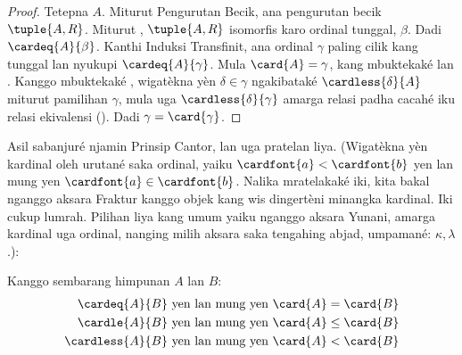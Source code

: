 \documentclass[../../../include/open-logic-section]{subfiles}
\begin{document}
\begin{proof}
Tetepna $A$. Miturut Pengurutan Becik, ana pengurutan becik
$\tuple{A, R}$. Miturut
, $\tuple{A,
R}$ isomorfis karo ordinal tunggal, $\beta$. Dadi
$\cardeq{A}{\beta}$. Kanthi Induksi Transfinit, ana ordinal
$\gamma$ paling cilik kang tunggal lan nyukupi
$\cardeq{A}{\gamma}$. Mula $\card{A}
= \gamma$, kang mbuktekaké  lan .
Kanggo mbuktekaké , wigatèkna yèn $\delta \in \gamma$
ngakibataké $\cardless{\delta}{A}$ miturut pamilihan $\gamma$,
mula uga $\cardless{\delta}{\gamma}$ amarga relasi padha cacahé
iku relasi ekivalensi
(). Dadi $\gamma =
\card{\gamma}$.
\end{proof}

Asil sabanjuré njamin Prinsip Cantor, lan uga pratelan liya.
(Wigatèkna yèn kardinal oleh urutané saka ordinal, yaiku
$\cardfont{a} < \cardfont{b}$ yen lan mung yen $\cardfont{a} \in \cardfont{b}$. Nalika
mratelakaké iki, kita bakal nganggo aksara Fraktur kanggo objek
kang wis dingertèni minangka kardinal. Iki cukup lumrah.
Pilihan liya kang umum yaiku nganggo aksara Yunani,
amarga kardinal uga ordinal, nanging milih aksara saka
tengahing abjad, umpamané: $\kappa, \lambda$.):
\begin{lem}
Kanggo sembarang himpunan $A$ lan $B$:
\begin{align*}
	\cardeq{A}{B} &\text{ yen lan mung yen } \card{A} = \card{B}\\
	\cardle{A}{B} &\text{ yen lan mung yen } \card{A} \leq \card{B}\\
	\cardless{A}{B}&\text{ yen lan mung yen } \card{A} < \card{B}
\end{align*}
\end{lem}
\end{document}
